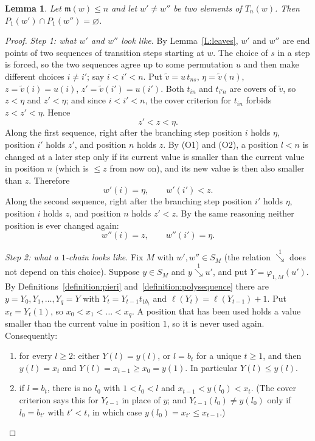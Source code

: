 \documentclass{amsart}
\newtheorem{lemma}{Lemma}[subsection]
\theoremstyle{definition}
\theoremstyle{remark}
\numberwithin{equation}{subsection}
\newcommand{\downvar}[1]{\stackrel{#1}{\searrow}}
\newcommand{\maxd}{\mathfrak{m}}
\begin{document}
\begin{lemma}\label{L:disjoint}
Let $\maxd(w)\le n$ and let $w'\neq w''$ be two elements of $T_n(w)$. Then $P_1(w')\cap P_1(w'')=\varnothing$.
\end{lemma}
\begin{proof}
\emph{Step 1: what $w'$ and $w''$ look like.}
By Lemma~\ref{L:leaves}, $w'$ and $w''$ are end points of two sequences of transition steps starting at $w$.
The choice of $s$ in a step is forced, so the two sequences agree up to some permutation $u$ and then make different
choices $i\neq i'$; say $i<i'<n$. Put $\tilde v=u\,t_{ns}$, $\eta=\tilde v(n)$, $z=\tilde v(i)=u(i)$, $z'=\tilde v(i')=u(i')$.
Both $t_{in}$ and $t_{i'n}$ are covers of $\tilde v$, so $z<\eta$ and $z'<\eta$; and since $i<i'<n$, the cover criterion for $t_{in}$
forbids $z<z'<\eta$. Hence
\[
z'<z<\eta .
\]
Along the first sequence, right after the branching step position $i$ holds $\eta$, position $i'$ holds $z'$, and position $n$ holds $z$.
By (O1) and (O2), a position $l<n$ is changed at a later step only if its current value is smaller than the current value in position $n$
(which is $\le z$ from now on), and its new value is then also smaller than $z$. Therefore
\begin{equation}\label{E:first}
w'(i)=\eta,\qquad w'(i')<z .
\end{equation}
Along the second sequence, right after the branching step position $i'$ holds $\eta$, position $i$ holds $z$, and position $n$ holds $z'<z$.
By the same reasoning neither position is ever changed again:
\begin{equation}\label{E:second}
w''(i)=z,\qquad w''(i')=\eta .
\end{equation}

\emph{Step 2: what a $1$-chain looks like.}
Fix $M$ with $w',w''\in S_M$ (the relation $\downvar{1}$ does not depend on this choice).
Suppose $y\in S_M$ and $y\downvar{1}u'$, and put $Y=\varphi_{1,M}(u')$. By Definitions~\ref{definition:pieri} and~\ref{definition:polysequence} there are
$y=Y_0,Y_1,\dots,Y_q=Y$ with $Y_t=Y_{t-1}t_{1b_t}$ and $\ell(Y_t)=\ell(Y_{t-1})+1$. Put $x_t=Y_t(1)$, so $x_0<x_1<\dots<x_q$.
A position that has been used holds a value smaller than the current value in position $1$, so it is never used again. Consequently:
\begin{enumerate}
\item[(F1)] for every $l\ge2$: either $Y(l)=y(l)$, or $l=b_t$ for a unique $t\ge1$, and then $y(l)=x_t$ and $Y(l)=x_{t-1}\ge x_0=y(1)$. In particular $Y(l)\le y(l)$.
\item[(F2)] if $l=b_t$, there is no $l_0$ with $1<l_0<l$ and $x_{t-1}<y(l_0)<x_t$.
(The cover criterion says this for $Y_{t-1}$ in place of $y$; and $Y_{t-1}(l_0)\neq y(l_0)$ only if $l_0=b_{t'}$ with $t'<t$,
in which case $y(l_0)=x_{t'}\le x_{t-1}$.)
\end{enumerate}


\end{proof}
\end{document}
